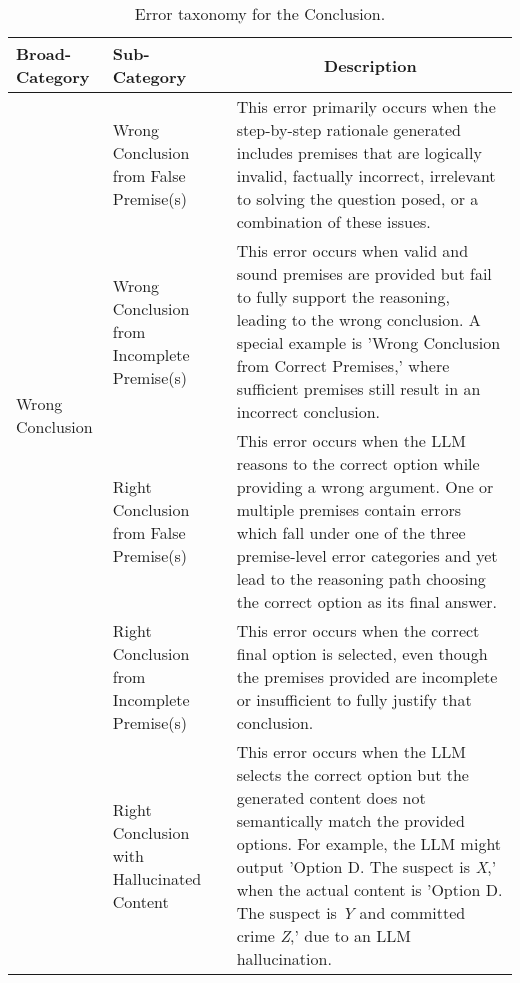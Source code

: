 \begin{table*}
\small
\begin{tabular}{l|p{3.8cm}|p{8.3cm}}
\toprule
\textbf{Broad-Category}           & \textbf{Sub-Category}                     & \multicolumn{1}{c}{\textbf{Description}}
                                                                                         \\ \midrule
\multirow{4}{*}{Wrong Conclusion} & Wrong Conclusion from False Premise(s)      & This error primarily occurs when the step-by-step rationale generated includes premises that are logically invalid, factually incorrect, irrelevant to solving the question posed, or a combination of these issues.                                                                                 \\ \cmidrule{2-3} 
                                  & Wrong Conclusion from Incomplete Premise(s) & This error occurs when valid and sound premises are provided but fail to fully support the reasoning, leading to the wrong conclusion. A special example is 'Wrong Conclusion from Correct Premises,' where sufficient premises still result in an incorrect conclusion.                 \\ \midrule
Right Conclusion                  & Right Conclusion from False Premise(s)      & This error occurs when the LLM reasons to the correct option while providing a wrong argument. One or multiple premises contain errors which fall under one of the three premise-level error categories and yet lead to the reasoning path choosing the correct option as its final answer. \\ \cmidrule{2-3}
                                  & Right Conclusion from Incomplete Premise(s) & This error occurs when the correct final option is selected, even though the premises provided are incomplete or insufficient to fully justify that conclusion.
                                  
                                                                                                    \\ \cmidrule{2-3}
                                  & Right Conclusion with Hallucinated Content & This error occurs when the LLM selects the correct option but the generated content does not semantically match the provided options. For example, the LLM might output 'Option D. The suspect is \textit{X},' when the actual content is 'Option D. The suspect is \textit{Y} and committed crime \textit{Z},' due to an LLM hallucination. 
                                  \\ \midrule
\end{tabular}
\caption{Error taxonomy for the Conclusion.}
\label{table:conclusion_errors}
\end{table*}

